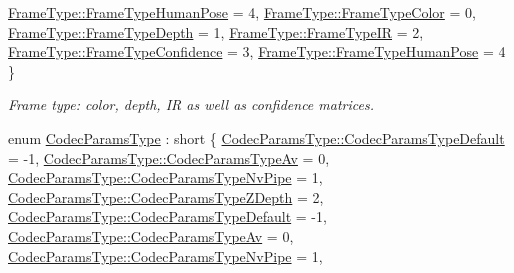 \begin{DoxyCompactItemize}
\newline
\hyperlink{namespacemoetsi_1_1ssp_a46efdfa2cd5a28ead465dcc8006b5a87aa4b26dd8fd8d1f8a6ba0cc75f2302018}{Frame\+Type\+::\+Frame\+Type\+Human\+Pose} = 4, 
\hyperlink{namespacemoetsi_1_1ssp_a46efdfa2cd5a28ead465dcc8006b5a87ad039a5ecd3504edc955b88006db4ba21}{Frame\+Type\+::\+Frame\+Type\+Color} = 0, 
\hyperlink{namespacemoetsi_1_1ssp_a46efdfa2cd5a28ead465dcc8006b5a87a59cea6d94577d85ef8e142036e047064}{Frame\+Type\+::\+Frame\+Type\+Depth} = 1, 
\hyperlink{namespacemoetsi_1_1ssp_a46efdfa2cd5a28ead465dcc8006b5a87a2c799f7416882b538fa8295567f65cf5}{Frame\+Type\+::\+Frame\+Type\+IR} = 2, 
\newline
\hyperlink{namespacemoetsi_1_1ssp_a46efdfa2cd5a28ead465dcc8006b5a87a1b85b2c60b857778932e29e0e5021ba1}{Frame\+Type\+::\+Frame\+Type\+Confidence} = 3, 
\hyperlink{namespacemoetsi_1_1ssp_a46efdfa2cd5a28ead465dcc8006b5a87aa4b26dd8fd8d1f8a6ba0cc75f2302018}{Frame\+Type\+::\+Frame\+Type\+Human\+Pose} = 4
 \}\begin{DoxyCompactList}\small\item\em Frame type\+: color, depth, IR as well as confidence matrices. \end{DoxyCompactList}
\item 
enum \hyperlink{namespacemoetsi_1_1ssp_a6d638ba0bd38e9daded08f633d893563}{Codec\+Params\+Type} \+: short \{ \newline
\hyperlink{namespacemoetsi_1_1ssp_a6d638ba0bd38e9daded08f633d893563a1ffd3a6c06641b95d3e5142403ed0730}{Codec\+Params\+Type\+::\+Codec\+Params\+Type\+Default} = -\/1, 
\hyperlink{namespacemoetsi_1_1ssp_a6d638ba0bd38e9daded08f633d893563a55e78e5ce82b1d5dcfbb2381af26698f}{Codec\+Params\+Type\+::\+Codec\+Params\+Type\+Av} = 0, 
\hyperlink{namespacemoetsi_1_1ssp_a6d638ba0bd38e9daded08f633d893563ac818f912b0dd4cd2868a1a03d5c570a1}{Codec\+Params\+Type\+::\+Codec\+Params\+Type\+Nv\+Pipe} = 1, 
\hyperlink{namespacemoetsi_1_1ssp_a6d638ba0bd38e9daded08f633d893563a4e738f8ec62ed2fd5d5675f71b291992}{Codec\+Params\+Type\+::\+Codec\+Params\+Type\+Z\+Depth} = 2, 
\newline
\hyperlink{namespacemoetsi_1_1ssp_a6d638ba0bd38e9daded08f633d893563a1ffd3a6c06641b95d3e5142403ed0730}{Codec\+Params\+Type\+::\+Codec\+Params\+Type\+Default} = -\/1, 
\hyperlink{namespacemoetsi_1_1ssp_a6d638ba0bd38e9daded08f633d893563a55e78e5ce82b1d5dcfbb2381af26698f}{Codec\+Params\+Type\+::\+Codec\+Params\+Type\+Av} = 0, 
\hyperlink{namespacemoetsi_1_1ssp_a6d638ba0bd38e9daded08f633d893563ac818f912b0dd4cd2868a1a03d5c570a1}{Codec\+Params\+Type\+::\+Codec\+Params\+Type\+Nv\+Pipe} = 1, 

\end{DoxyCompactItemize}
